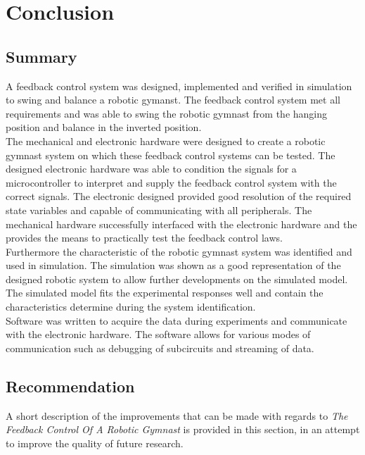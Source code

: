 \chapter{Conclusion}
\label{chp:conclusion}



\section{Summary}
A feedback control system was designed, implemented and verified in simulation to swing and balance a robotic gymanst. The feedback control system met all requirements and was able to swing the robotic gymnast from the hanging position and balance in the inverted position.\\
 
The mechanical and electronic hardware were designed to create a robotic gymnast system on which these feedback control systems can be tested. The designed electronic hardware was able to condition the signals for a microcontroller to interpret and supply the feedback control system with the correct signals. The electronic designed provided good resolution of the required state variables and capable of communicating with all peripherals. The mechanical hardware successfully interfaced with the electronic hardware and the provides the means to practically test the feedback control laws.\\

Furthermore the characteristic of the robotic gymnast system was identified and used in simulation. The simulation was shown as a good representation of the designed robotic system to allow further developments on the simulated model. The simulated model fits the experimental responses well and contain the characteristics determine during the system identification.\\

Software was written to acquire the data during experiments and communicate with the electronic hardware. The software allows for various modes of communication such as debugging of subcircuits and streaming of data.\\

\section{Recommendation}
A short description of the improvements that can be made with regards to \textit{The Feedback Control Of A Robotic Gymnast} is provided in this section, in an attempt to improve the quality of future research.\\

